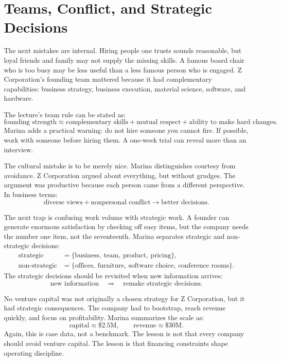 \section{Teams, Conflict, and Strategic Decisions}

The next mistakes are internal. Hiring people one trusts sounds reasonable, but loyal friends and family may not supply the missing skills. A famous board chair who is too busy may be less useful than a less famous person who is engaged. Z Corporation's founding team mattered because it had complementary capabilities: business strategy, business execution, material science, software, and hardware.

The lecture's team rule can be stated as:
\begin{equation}
\text{founding strength}
\approx
\text{complementary skills}
+
\text{mutual respect}
+
\text{ability to make hard changes}.
\end{equation}
Marina adds a practical warning: do not hire someone you cannot fire. If possible, work with someone before hiring them. A one-week trial can reveal more than an interview.

The cultural mistake is to be merely nice. Marina distinguishes courtesy from avoidance. Z Corporation argued about everything, but without grudges. The argument was productive because each person came from a different perspective. In business terms:
\begin{equation}
\text{diverse views}+\text{nonpersonal conflict}
\longrightarrow
\text{better decisions}.
\end{equation}

The next trap is confusing work volume with strategic work. A founder can generate enormous satisfaction by checking off easy items, but the company needs the number one item, not the seventeenth. Marina separates strategic and non-strategic decisions:
\begin{align}
\text{strategic} &=
\{\text{business},\ \text{team},\ \text{product},\ \text{pricing}\},\\
\text{non-strategic} &=
\{\text{offices},\ \text{furniture},\ \text{software choice},\ \text{conference rooms}\}.
\end{align}
The strategic decisions should be revisited when new information arrives:
\begin{equation}
\text{new information}
\quad\Rightarrow\quad
\text{remake strategic decisions}.
\end{equation}

No venture capital was not originally a chosen strategy for Z Corporation, but it had strategic consequences. The company had to bootstrap, reach revenue quickly, and focus on profitability. Marina summarizes the scale as:
\begin{equation}
\text{capital}\approx \$2.5\text{M},
\qquad
\text{revenue}\approx \$30\text{M}.
\end{equation}
Again, this is case data, not a benchmark. The lesson is not that every company should avoid venture capital. The lesson is that financing constraints shape operating discipline.


